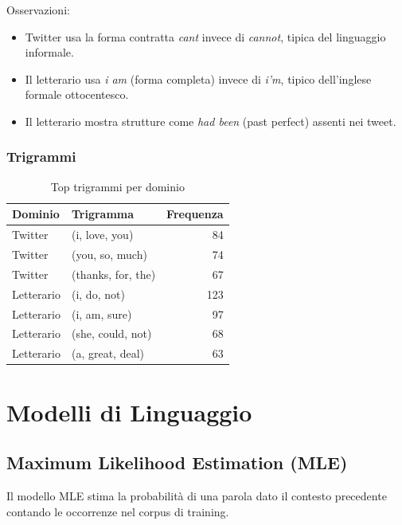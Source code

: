 \documentclass[12pt, a4paper]{article}
\begin{document}
Osservazioni:
\begin{itemize}
    \item Twitter usa la forma contratta \textit{cant} invece di \textit{cannot},
          tipica del linguaggio informale.
    \item Il letterario usa \textit{i am} (forma completa) invece di \textit{i'm},
          tipico dell'inglese formale ottocentesco.
    \item Il letterario mostra strutture come \textit{had been} (past perfect)
          assenti nei tweet.
\end{itemize}

\subsubsection{Trigrammi}

\begin{table}[H]
\centering
\begin{tabular}{llr}
\toprule
\textbf{Dominio} & \textbf{Trigramma} & \textbf{Frequenza} \\
\midrule
Twitter & (i, love, you)        & 84 \\
Twitter & (you, so, much)       & 74 \\
Twitter & (thanks, for, the)    & 67 \\
\midrule
Letterario & (i, do, not)         & 123 \\
Letterario & (i, am, sure)        & 97 \\
Letterario & (she, could, not)    & 68 \\
Letterario & (a, great, deal)     & 63 \\
\bottomrule
\end{tabular}
\caption{Top trigrammi per dominio}
\end{table}

\section{Modelli di Linguaggio}

\subsection{Maximum Likelihood Estimation (MLE)}

Il modello MLE stima la probabilità di una parola dato il contesto
precedente contando le occorrenze nel corpus di training.
\end{document}
